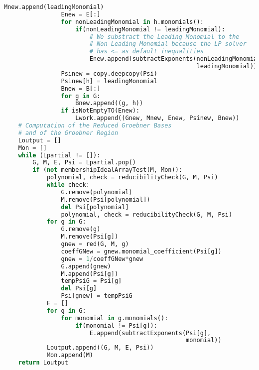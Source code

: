 \begin{lstlisting}[language=Python]
                Mnew.append(leadingMonomial)
                Enew = E[:]
                for nonLeadingMonomial in h.monomials():
                    if(nonLeadingMonomial != leadingMonomial):
                        # We substract the Leading Monomial to the
                        # Non Leading Monomial because the LP solver
                        # has <= as default inequalities
                        Enew.append(subtractExponents(nonLeadingMonomial,
                                                      leadingMonomial))
                Psinew = copy.deepcopy(Psi)
                Psinew[h] = leadingMonomial
                Bnew = B[:]
                for g in G:
                    Bnew.append((g, h))
                if isNotEmptyTO(Enew):
                    Lwork.append((Gnew, Mnew, Enew, Psinew, Bnew))
    # Computation of the Reduced Groebner Bases
    # and of the Groebner Region
    Loutput = []
    Mon = []
    while (Lpartial != []):
        G, M, E, Psi = Lpartial.pop()
        if (not membershipIdealArrayTest(M, Mon)):
            polynomial, check = reducibilityCheck(G, M, Psi)
            while check:
                G.remove(polynomial)
                M.remove(Psi[polynomial])
                del Psi[polynomial]
                polynomial, check = reducibilityCheck(G, M, Psi)
            for g in G:
                G.remove(g)
                M.remove(Psi[g])
                gnew = red(G, M, g)
                coeffGNew = gnew.monomial_coefficient(Psi[g])
                gnew = 1/coeffGNew*gnew
                G.append(gnew)
                M.append(Psi[g])
                tempPsiG = Psi[g]
                del Psi[g]
                Psi[gnew] = tempPsiG
            E = []
            for g in G:
                for monomial in g.monomials():
                    if(monomial != Psi[g]):
                        E.append(subtractExponents(Psi[g],
                                                   monomial))
            Loutput.append((G, M, E, Psi))
            Mon.append(M)
    return Loutput
\end{lstlisting}


